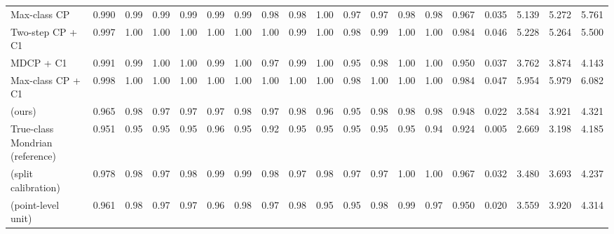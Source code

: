 \begin{table}[!htbp]
{\begin{tabular}{lcccccccccccccccccc}
Max-class CP & 0.990 & 0.99 & 0.99 & 0.99 & 0.99 & 0.99 & 0.98 & 0.98 & 1.00 & 0.97 & 0.97 & 0.98 & 0.98 & 0.967 & 0.035 & 5.139 & 5.272 & 5.761 \\
Two-step CP + C1 & 0.997 & 1.00 & 1.00 & 1.00 & 1.00 & 1.00 & 1.00 & 0.99 & 1.00 & 0.98 & 0.99 & 1.00 & 1.00 & 0.984 & 0.046 & 5.228 & 5.264 & 5.500 \\
MDCP + C1 & 0.991 & 0.99 & 1.00 & 1.00 & 0.99 & 1.00 & 0.97 & 0.99 & 1.00 & 0.95 & 0.98 & 1.00 & 1.00 & 0.950 & 0.037 & 3.762 & 3.874 & 4.143 \\
Max-class CP + C1 & 0.998 & 1.00 & 1.00 & 1.00 & 1.00 & 1.00 & 1.00 & 1.00 & 1.00 & 0.98 & 1.00 & 1.00 & 1.00 & 0.984 & 0.047 & 5.954 & 5.979 & 6.082 \\
\gamut{} (ours) & 0.965 & 0.98 & 0.97 & 0.97 & 0.97 & 0.98 & 0.97 & 0.98 & 0.96 & 0.95 & 0.98 & 0.98 & 0.98 & 0.948 & 0.022 & 3.584 & 3.921 & 4.321 \\
True-class Mondrian (reference) & 0.951 & 0.95 & 0.95 & 0.95 & 0.96 & 0.95 & 0.92 & 0.95 & 0.95 & 0.95 & 0.95 & 0.95 & 0.94 & 0.924 & 0.005 & 2.669 & 3.198 & 4.185 \\
\gamut{} (split calibration) & 0.978 & 0.98 & 0.97 & 0.98 & 0.99 & 0.99 & 0.98 & 0.97 & 0.98 & 0.97 & 0.97 & 1.00 & 1.00 & 0.967 & 0.032 & 3.480 & 3.693 & 4.237 \\
\gamut{} (point-level unit) & 0.961 & 0.98 & 0.97 & 0.97 & 0.96 & 0.98 & 0.97 & 0.98 & 0.95 & 0.95 & 0.98 & 0.99 & 0.97 & 0.950 & 0.020 & 3.559 & 3.920 & 4.314 \\
\bottomrule
\end{tabular}}
\end{table}
\FloatBarrier
